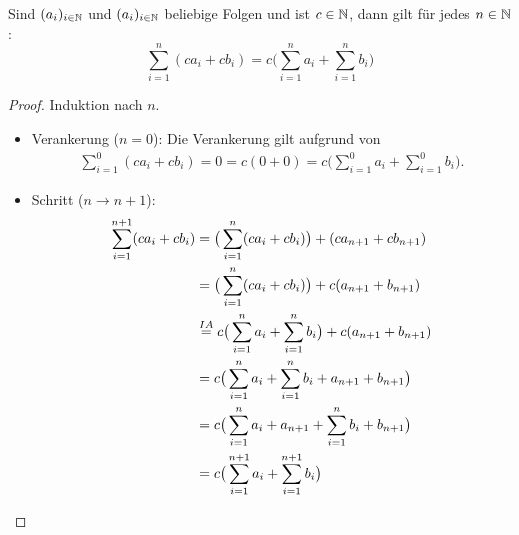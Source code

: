 \begin{satz}\label{satz:partialsummen}
 Sind $(a_i)_{i\in\mathbb{N}}$ und $(a_i)_{i\in\mathbb{N}}$ beliebige Folgen und ist $c\in\mathbb{N}$, dann gilt für jedes $n\in\mathbb{N}$:
\[
 \sum_{i=1}^n(ca_i+cb_i)=c\big(\sum_{i=1}^na_i+\sum_{i=1}^nb_i\big)
\]
\end{satz}
\begin{proof}
 Induktion nach $n$.
 \begin{itemize}
 \item Verankerung ($n=0$): Die Verankerung gilt aufgrund von
 \begin{align*}
\sum_{i=1}^0(ca_i+cb_i)=0=c(0+0)=c\big(\sum_{i=1}^0a_i+\sum_{i=1}^0b_i\big).
 \end{align*}
 \item Schritt ($n\to n+1$):
 \begin{align*}
\sum_{i=1}^{n+1}(ca_i+cb_i)&=\big(\sum_{i=1}^n(ca_i+cb_i)\big)+(ca_{n+1}+cb_{n+1})\\
&=\big(\sum_{i=1}^n(ca_i+cb_i)\big)+c(a_{n+1}+b_{n+1})\\
&\stackrel{IA}{=}c\big(\sum_{i=1}^na_i+\sum_{i=1}^nb_i\big)+c(a_{n+1}+b_{n+1})\\
&=c\big( \sum_{i=1}^na_i+\sum_{i=1}^nb_i+a_{n+1}+b_{n+1} \big)\\
&=c\big( \sum_{i=1}^na_i+a_{n+1}+\sum_{i=1}^nb_i+b_{n+1} \big)\\
&=c\big( \sum_{i=1}^{n+1}a_i+\sum_{i=1}^{n+1}b_i\big)\qedhere
 \end{align*}
 \end{itemize}
\end{proof}


